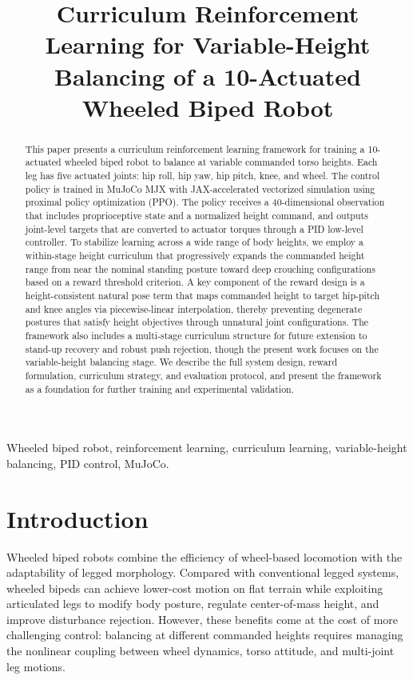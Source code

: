 \documentclass[conference]{IEEEtran}
\title{Curriculum Reinforcement Learning for Variable-Height Balancing of a 10-Actuated Wheeled Biped Robot}
\author{
\IEEEauthorblockN{Van Thuong Nguyen}
\IEEEauthorblockA{
Your Institution\\
Email: vanthuong180702t@gmail.com
}
}
\begin{document}
\maketitle

\begin{abstract}
This paper presents a curriculum reinforcement learning framework for training a 10-actuated wheeled biped robot to balance at variable commanded torso heights. Each leg has five actuated joints: hip roll, hip yaw, hip pitch, knee, and wheel. The control policy is trained in MuJoCo MJX with JAX-accelerated vectorized simulation using proximal policy optimization (PPO). The policy receives a 40-dimensional observation that includes proprioceptive state and a normalized height command, and outputs joint-level targets that are converted to actuator torques through a PID low-level controller. To stabilize learning across a wide range of body heights, we employ a within-stage height curriculum that progressively expands the commanded height range from near the nominal standing posture toward deep crouching configurations based on a reward threshold criterion. A key component of the reward design is a height-consistent natural pose term that maps commanded height to target hip-pitch and knee angles via piecewise-linear interpolation, thereby preventing degenerate postures that satisfy height objectives through unnatural joint configurations. The framework also includes a multi-stage curriculum structure for future extension to stand-up recovery and robust push rejection, though the present work focuses on the variable-height balancing stage. We describe the full system design, reward formulation, curriculum strategy, and evaluation protocol, and present the framework as a foundation for further training and experimental validation.
\end{abstract}

\begin{IEEEkeywords}
Wheeled biped robot, reinforcement learning, curriculum learning, variable-height balancing, PID control, MuJoCo.
\end{IEEEkeywords}

\section{Introduction}
Wheeled biped robots combine the efficiency of wheel-based locomotion with the adaptability of legged morphology. Compared with conventional legged systems, wheeled bipeds can achieve lower-cost motion on flat terrain while exploiting articulated legs to modify body posture, regulate center-of-mass height, and improve disturbance rejection. However, these benefits come at the cost of more challenging control: balancing at different commanded heights requires managing the nonlinear coupling between wheel dynamics, torso attitude, and multi-joint leg motions.
\end{document}

